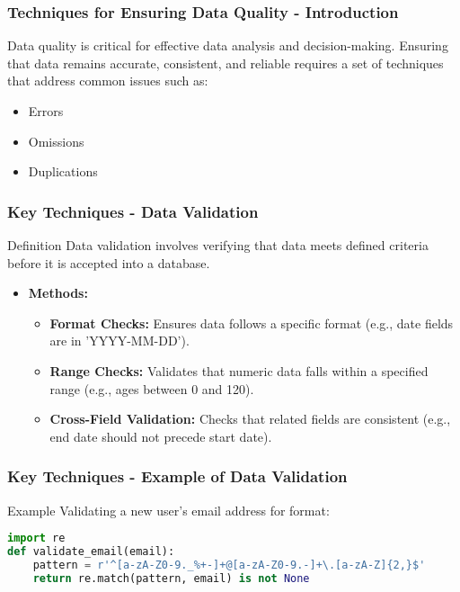 \documentclass{beamer}
\begin{document}
\begin{frame}[fragile]
    \frametitle{Techniques for Ensuring Data Quality - Introduction}
    Data quality is critical for effective data analysis and decision-making. Ensuring that data remains accurate, consistent, and reliable requires a set of techniques that address common issues such as:
    \begin{itemize}
        \item Errors
        \item Omissions
        \item Duplications
    \end{itemize}
\end{frame}

\begin{frame}[fragile]
    \frametitle{Key Techniques - Data Validation}
    \begin{block}{Definition}
        Data validation involves verifying that data meets defined criteria before it is accepted into a database.
    \end{block}
    
    \begin{itemize}
        \item \textbf{Methods:}
        \begin{itemize}
            \item \textbf{Format Checks:} Ensures data follows a specific format (e.g., date fields are in 'YYYY-MM-DD').
            \item \textbf{Range Checks:} Validates that numeric data falls within a specified range (e.g., ages between 0 and 120).
            \item \textbf{Cross-Field Validation:} Checks that related fields are consistent (e.g., end date should not precede start date).
        \end{itemize}
    \end{itemize}
\end{frame}

\begin{frame}[fragile]
    \frametitle{Key Techniques - Example of Data Validation}
    \begin{block}{Example}
        Validating a new user’s email address for format:
    \end{block}

    \begin{lstlisting}[language=Python]
import re
def validate_email(email):
    pattern = r'^[a-zA-Z0-9._%+-]+@[a-zA-Z0-9.-]+\.[a-zA-Z]{2,}$'
    return re.match(pattern, email) is not None
    \end{lstlisting}
\end{frame}
\end{document}
